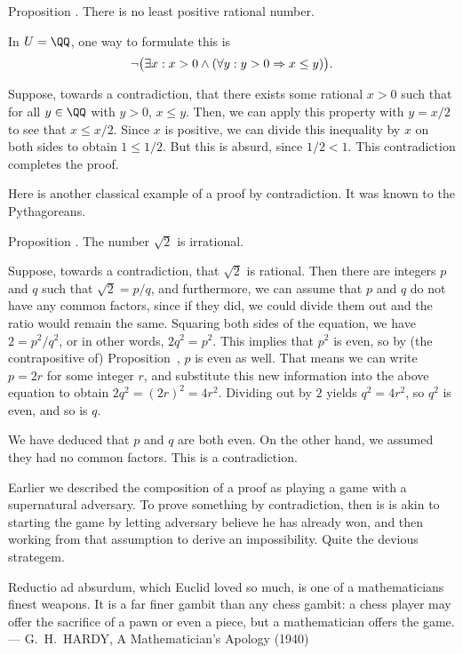 \proclaim Proposition \advthm. There is no least positive rational number.

\noindent In $U = \QQ$, one way to formulate this is
$$\neg \bigl(\exists x: x > 0 \wedge (\forall y : y > 0 \Rightarrow x \le y)\bigr).$$

\proof Suppose, towards a contradiction, that there exists some rational $x>0$ such that for all $y\in \QQ$
with $y > 0$, $x\le y$. Then, we can apply this property with $y = x/2$ to see that $x \le x/2$.
Since $x$ is positive, we can divide this inequality by $x$ on both sides to obtain $1\le 1/2$. But this
is absurd, since $1/2 < 1$. This contradiction completes the proof.\slug

Here is another classical example of a proof by contradiction. It was known to the Pythagoreans.

\edef\propsqrttwo{\the\thmcount}
\proclaim Proposition \advthm. The number $\sqrt 2$ is irrational.

\proof Suppose, towards a contradiction, that $\sqrt 2$ is rational. Then there are integers $p$ and $q$
such that $\sqrt 2 = p/q$, and furthermore, we can assume that $p$ and $q$ do not have any common factors,
since if they did, we could divide them out and the ratio would remain the same.
Squaring both sides of the equation, we have $2 = p^2/q^2$, or in other words, $2q^2 = p^2$. This implies
that $p^2$ is even, so by (the contrapositive of) Proposition~{\propsquareoddimpliesodd}, $p$ is even as well.
That means we can write $p=2r$ for some integer $r$, and substitute this new information
into the above equation to obtain $2q^2 = (2r)^2 = 4r^2$. Dividing out by $2$ yields $q^2 = 4r^2$,
so $q^2$ is even, and so is $q$.

We have deduced that $p$ and $q$ are both even. On the other hand, we assumed they had no common factors.
This is a contradiction.\slug

Earlier we described the composition of a proof as playing a game with a supernatural adversary.
To prove something by contradiction, then is is akin to starting the game
by letting adversary believe he has already won,
and then working from that assumption to derive an impossibility. Quite the devious strategem.

\bigskip
\begingroup\obeylines\eightssi
\hfill {\eightss Reductio ad absurdum}, which Euclid loved so much,
\hfill is one of a mathematicians finest weapons.
\hfill It is a far finer gambit than any chess gambit:
\hfill a chess player may offer the sacrifice of a pawn
\hfill or even a piece,
\hfill but a mathematician offers the {\eightss game}.
\eightss
\smallskip
\hfill --- G.~H.~HARDY, {\eightssi A Mathematician's Apology} (1940)
\endgroup%
\bigskip\goodbreak

